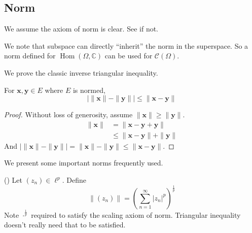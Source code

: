\documentclass[10pt]{article}
\DeclareMathOperator{\Hom}{Hom}
\begin{document}
\subsection{Norm}

We assume the axiom of norm is clear. See \cite[Definition 1.3.1]{intro-hilbert} if not.

We note that subspace can directly ``inherit'' the norm in the superspace. So a norm defined for $\Hom(\Omega, \mathbb{C})$ can be used for $\mathcal{C}(\Omega)$.

We prove the classic inverse triangular inequality.
\begin{theorem}
  \label{thm:inverse-trig}
  For $\mathbf{x}, \mathbf{y} \in E$ where $E$ is normed,
  \begin{equation}
    |\|\mathbf{x}\| - \|\mathbf{y}\|| \leq \|\mathbf{x} - \mathbf{y}\|
  \end{equation}
\end{theorem}
\begin{proof}
  Without loss of generosity, assume $\|\mathbf{x}\| \geq \|\mathbf{y}\|$.
\begin{align}
  \|\mathbf{x}\| &= \|\mathbf{x} - \mathbf{y} + \mathbf{y}\| \\
                 &\leq \|\mathbf{x} -\mathbf{y}\| + \|\mathbf{y}\|
\end{align}
And $|\|\mathbf{x}\| - \|\mathbf{y} \|| = \|\mathbf{x}\| - \|\mathbf{y} \| \leq \|\mathbf{x} - \mathbf{y}\|$.
\end{proof}

We present some important norms frequently used.

\begin{example} (\cite[Example 1.3.4]{intro-hilbert})
  Let $(z_n) \in \ell^p$. Define
  \begin{equation}
    \|(z_n)\| = (\sum\limits_{n=1}^{\infty} |z_n|^p)^{\frac{1}{p}}
  \end{equation}
  Note $\cdot ^{\frac{1}{p}}$ required to satisfy the scaling axiom of norm. Triangular inequality doesn't really need that to be satisfied.
\end{example}
\end{document}
